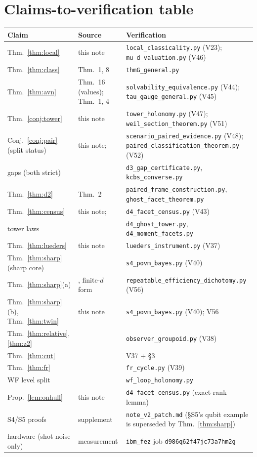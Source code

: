 \documentclass[11pt]{article}
\theoremstyle{definition}
\theoremstyle{remark}
\begin{document}
\section{Claims-to-verification table}
\begin{center}\small
\begin{tabular}{lll}
\toprule
Claim & Source & Verification\\
\midrule
Thm.~\ref{thm:local} & this note & \texttt{local\_classicality.py} (V23); \texttt{mu\_d\_valuation.py} (V46)\\
Thm.~\ref{thm:class} & \cite{paperA} Thm.~1, 8 & \texttt{thmG\_general.py}\\
Thm.~\ref{thm:avn} & \cite{ACC} Thm.~16 (values); \cite{paperB} Thm.~1, 4 & \texttt{solvability\_equivalence.py} (V44); \texttt{tau\_gauge\_general.py} (V45)\\
Thm.~\ref{conj:tower} & this note & \texttt{tower\_holonomy.py} (V47); \texttt{weil\_section\_theorem.py} (V51)\\
Conj.~\ref{conj:pair} (split status) & this note; \cite{paperC} & \texttt{scenario\_paired\_evidence.py} (V48); \texttt{paired\_classification\_theorem.py} (V52)\\
gaps (both strict) & \cite{paperC} & \texttt{d3\_gap\_certificate.py}, \texttt{kcbs\_converse.py}\\
Thm.~\ref{thm:d2} & \cite{paperC} Thm.~2 & \texttt{paired\_frame\_construction.py}, \texttt{ghost\_facet\_theorem.py}\\
Thm.~\ref{thm:census} & this note; \cite{paperC} & \texttt{d4\_facet\_census.py} (V43)\\
tower laws & \cite{paperC} & \texttt{d4\_ghost\_tower.py}, \texttt{d4\_moment\_facets.py}\\
Thm.~\ref{thm:lueders} & this note & \texttt{lueders\_instrument.py} (V37)\\
Thm.~\ref{thm:sharp} (sharp core) & \cite{Ozawa84,BGL95,HLPPY03,BLPY16} & \texttt{s4\_povm\_bayes.py} (V40)\\
Thm.~\ref{thm:sharp}(a) & \cite{BDP04}, finite-$d$ form & \texttt{repeatable\_efficiency\_dichotomy.py} (V56)\\
Thm.~\ref{thm:sharp}(b), Thm.~\ref{thm:twin} & this note & \texttt{s4\_povm\_bayes.py} (V40); V56\\
Thm.~\ref{thm:relative}, \ref{thm:z2} & \cite{paperD} & \texttt{observer\_groupoid.py} (V38)\\
Thm.~\ref{thm:cut} & \cite{paperD} & V37 + \cite{paperD} \S3\\
Thm.~\ref{thm:fr} & \cite{paperD} & \texttt{fr\_cycle.py} (V39)\\
WF level split & \cite{paperC} & \texttt{wf\_loop\_holonomy.py}\\
Prop.~\ref{lem:onhull} & this note & \texttt{d4\_facet\_census.py} (exact-rank lemma)\\
S4/S5 proofs & supplement & \texttt{note\_v2\_patch.md} (\S S5's qubit example is superseded by Thm.~\ref{thm:sharp})\\
hardware (shot-noise only) & measurement & \texttt{ibm\_fez} job \texttt{d986q62f47jc73a7hm2g}\\
\bottomrule
\end{tabular}
\end{center}
\end{document}
